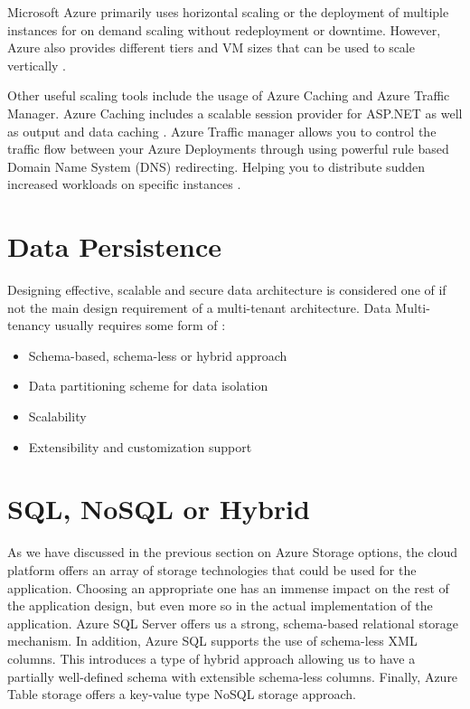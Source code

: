 Microsoft Azure primarily uses horizontal scaling or the deployment of multiple instances for on demand scaling without redeployment or downtime. However, Azure also provides different tiers and VM sizes that can be used to scale vertically \cite{Betts2012-ad}.
 
Other useful scaling tools include the usage of Azure Caching and Azure Traffic Manager. Azure Caching includes a scalable session provider for ASP.NET as well as output and data caching \cite{Microsoft_Corporation_undated-ej}. Azure Traffic manager allows you to control the traffic flow between your Azure Deployments through using powerful rule based Domain Name System (DNS) redirecting. Helping you to distribute sudden increased workloads on specific instances \cite{Betts2012-ad}.

\section{Data Persistence}

Designing effective, scalable and secure data architecture is considered one of if not the main design requirement of a multi-tenant architecture.
Data Multi-tenancy  usually requires some form of \cite{Betts2012-ad}:

\begin{itemize}
\item Schema-based, schema-less or hybrid approach
\item Data partitioning scheme for data isolation
\item Scalability
\item Extensibility and customization support
\end{itemize}


\section{SQL, NoSQL or Hybrid}

As we have discussed in the previous section on Azure Storage options, the cloud platform offers an array of storage technologies that could be used for the application. Choosing an appropriate one has an immense impact on the rest of the application design, but even more so in the actual implementation of the application. Azure SQL Server offers us a strong, schema-based relational storage mechanism. In addition, Azure SQL supports the use of schema-less XML columns. This introduces a type of hybrid approach allowing us to have a partially well-defined schema with extensible schema-less columns. Finally, Azure Table storage offers a key-value type NoSQL storage approach.
 

